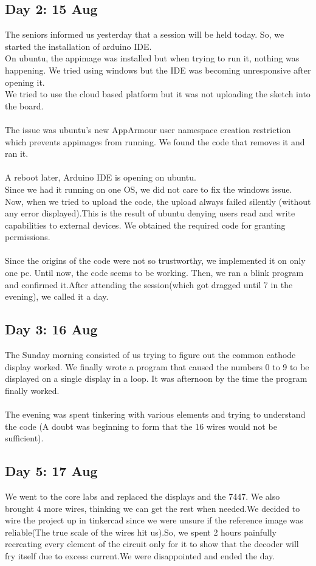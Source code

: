 \documentclass{report}
\begin{document}
\subsection{Day 2: 15 Aug}
The seniors informed us yesterday that a session will be held today. So, we started the installation of arduino IDE.\\ On ubuntu, the appimage was installed but when trying to run it, nothing was happening. We tried using windows but the IDE was becoming unresponsive after  opening it.\\ We tried to use the cloud based platform but it was not uploading the sketch into the board. 
\\\\The issue was ubuntu's new AppArmour user namespace creation restriction which prevents appimages from running. We found the code that removes it and ran it. \\\\A reboot later, Arduino IDE is opening on ubuntu.\\
Since we had it running on one OS, we did not care to fix the windows issue.\\
Now, when we tried to upload the code, the upload always failed silently (without any error displayed).This is the result of ubuntu denying users read and write capabilities to external devices. We obtained the required code for granting permissions.\\\\ Since the origins of the code were not so trustworthy, we implemented it on only one pc. Until now, the code seems to be working. Then, we ran a blink program and confirmed it.After attending the session(which got dragged until 7 in the evening), we called it a day.
\subsection{Day 3: 16 Aug}
The Sunday morning consisted of us trying to figure out the common cathode display worked. We finally wrote a program that caused the numbers 0 to 9 to be displayed on a single display in a loop. It was afternoon by the time the program finally worked.\\\\
The evening was spent tinkering with various elements and trying to understand the code (A doubt was beginning to form that the 16 wires would not be sufficient).
\subsection{Day 5: 17 Aug}
We went to the core labs and replaced the displays and the 7447. We also brought 4 more wires, thinking we can get the rest when needed.We decided to wire the project up in tinkercad since we were unsure if the reference image was reliable(The true scale of the wires hit us).So, we spent 2 hours painfully recreating every element of the circuit only for it to show that the decoder will fry itself due to excess current.We were disappointed and ended the day.
\end{document}
